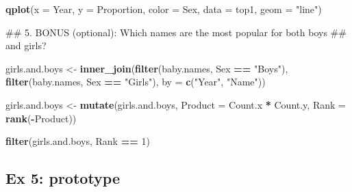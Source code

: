 \documentclass[]{book}
\newenvironment{Shaded}{\begin{snugshade}}{\end{snugshade}}
\newcommand{\KeywordTok}[1]{\textcolor[rgb]{0.13,0.29,0.53}{\textbf{#1}}}
\newcommand{\DataTypeTok}[1]{\textcolor[rgb]{0.13,0.29,0.53}{#1}}
\newcommand{\DecValTok}[1]{\textcolor[rgb]{0.00,0.00,0.81}{#1}}
\newcommand{\StringTok}[1]{\textcolor[rgb]{0.31,0.60,0.02}{#1}}
\newcommand{\OperatorTok}[1]{\textcolor[rgb]{0.81,0.36,0.00}{\textbf{#1}}}
\newcommand{\NormalTok}[1]{#1}
\begin{document}
\begin{Shaded}
\begin{Highlighting}[]
\KeywordTok{qplot}\NormalTok{(}\DataTypeTok{x =}\NormalTok{ Year, }\DataTypeTok{y =}\NormalTok{ Proportion, }\DataTypeTok{color =}\NormalTok{ Sex, }
      \DataTypeTok{data =}\NormalTok{ top1, }
      \DataTypeTok{geom =} \StringTok{"line"}\NormalTok{)}
\end{Highlighting}
\end{Shaded}

\begin{Shaded}
\begin{Highlighting}[]
\NormalTok{## 5. BONUS (optional): Which names are the most popular for both boys }
\NormalTok{##    and girls?}
\end{Highlighting}
\end{Shaded}

\begin{Shaded}
\begin{Highlighting}[]
\NormalTok{girls.and.boys <-}\StringTok{ }\KeywordTok{inner_join}\NormalTok{(}\KeywordTok{filter}\NormalTok{(baby.names, Sex }\OperatorTok{==}\StringTok{ "Boys"}\NormalTok{), }
                             \KeywordTok{filter}\NormalTok{(baby.names, Sex }\OperatorTok{==}\StringTok{ "Girls"}\NormalTok{),}
                             \DataTypeTok{by =} \KeywordTok{c}\NormalTok{(}\StringTok{"Year"}\NormalTok{, }\StringTok{"Name"}\NormalTok{))}
\end{Highlighting}
\end{Shaded}

\begin{Shaded}
\begin{Highlighting}[]
\NormalTok{girls.and.boys <-}\StringTok{ }\KeywordTok{mutate}\NormalTok{(girls.and.boys,}
                         \DataTypeTok{Product =}\NormalTok{ Count.x }\OperatorTok{*}\StringTok{ }\NormalTok{Count.y,}
                         \DataTypeTok{Rank =} \KeywordTok{rank}\NormalTok{(}\OperatorTok{-}\NormalTok{Product))}
\end{Highlighting}
\end{Shaded}

\begin{Shaded}
\begin{Highlighting}[]
\KeywordTok{filter}\NormalTok{(girls.and.boys, Rank }\OperatorTok{==}\StringTok{ }\DecValTok{1}\NormalTok{)}
\end{Highlighting}
\end{Shaded}

\subsection{Ex 5: prototype}\label{ex-5-prototype}
\end{document}
